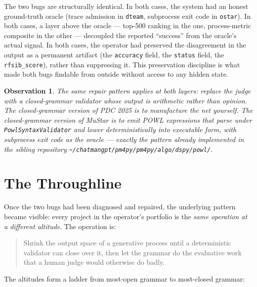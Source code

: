 \documentclass[11pt,letterpaper]{article}
\newtheorem{observation}{Observation}
\begin{document}
The two bugs are structurally identical. In both cases, the system had an honest ground-truth oracle (trace admission in \texttt{dteam}, subprocess exit code in \texttt{ostar}). In both cases, a layer above the oracle --- top-500 ranking in the one, process-metric composite in the other --- decoupled the reported ``success'' from the oracle's actual signal. In both cases, the operator had preserved the disagreement in the output as a permanent artifact (the \texttt{accuracy} field, the \texttt{status} field, the \texttt{rfsib\_score}), rather than suppressing it. This preservation discipline is what made both bugs findable from outside without access to any hidden state.

\begin{observation}
The same repair pattern applies at both layers: \emph{replace the judge with a closed-grammar validator whose output is arithmetic rather than opinion}. The closed-grammar version of PDC 2025 is to manufacture the net yourself. The closed-grammar version of MuStar is to emit POWL expressions that parse under \texttt{PowlSyntaxValidator} and lower deterministically into executable form, with subprocess exit code as the oracle --- exactly the pattern already implemented in the sibling repository \texttt{\textasciitilde/chatmangpt/pm4py/pm4py/algo/dspy/powl/}.
\end{observation}

\section{The Throughline}

Once the two bugs had been diagnosed and repaired, the underlying pattern became visible: every project in the operator's portfolio is the \emph{same operation at a different altitude}. The operation is:

\begin{quote}
Shrink the output space of a generative process until a deterministic validator can close over it, then let the grammar do the evaluative work that a human judge would otherwise do badly.
\end{quote}

The altitudes form a ladder from most-open grammar to most-closed grammar:
\end{document}
